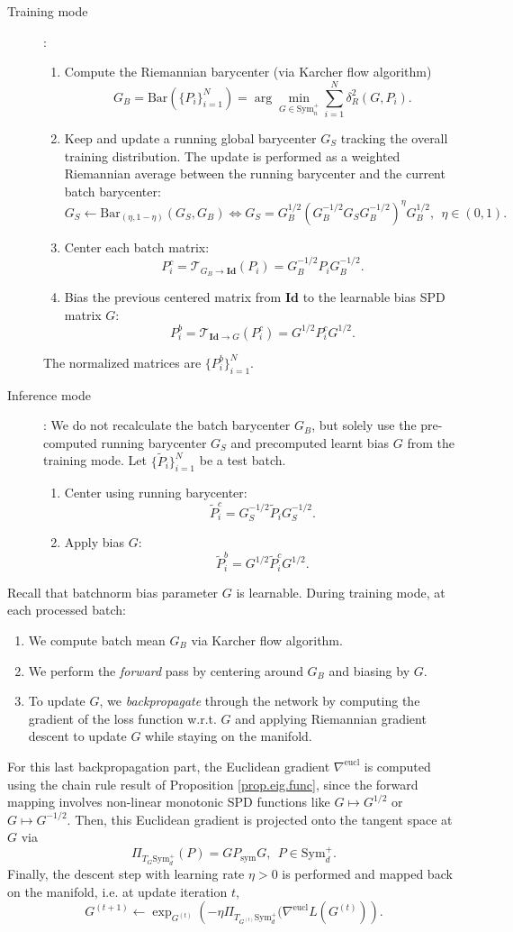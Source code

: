 \documentclass[10pt,a4paper]{book}
\theoremstyle{definition}
\theoremstyle{plain}
\theoremstyle{remark}
\newcommand{\Id}{\mathrm{\textbf{Id}}}
\begin{document}
\begin{description}
\item[Training mode]: 
\begin{enumerate}
\item Compute the Riemannian barycenter (via Karcher flow algorithm)
$$G_B=\text{Bar}(\{P_i\}_{i=1}^{N})=\arg\min_{G\in \text{Sym}_n^{+}}\sum_{i=1}^{N}\delta_R^{2}(G,P_i).$$
\item Keep and update a running global barycenter $G_S$ tracking the overall training distribution. The update is performed as a weighted Riemannian average between the running barycenter and the current batch barycenter:
$$G_S\leftarrow \text{Bar}_{(\eta,1-\eta)}(G_S,G_B) \iff G_S=G_B^{1/2}(G_B^{-1/2}G_SG_B^{-1/2})^{\eta}G_B^{1/2},~~\eta \in (0,1).$$
\item Center each batch matrix:
$$P_i^{c}=\mathcal{T}_{G_B\to \Id}(P_i)=G_B^{-1/2}P_iG_B^{-1/2}.$$
\item Bias the previous centered matrix from $\Id$ to the learnable bias SPD matrix $G$:
$$P_{i}^{b}=\mathcal{T}_{\Id \to G}(P_i^{c})=G^{1/2}P_i^{c}G^{1/2}.$$
\end{enumerate}
The normalized matrices are $\{P_i^{b}\}_{i=1}^{N}$. 
\item[Inference mode]:
We do not recalculate the batch barycenter $G_B$, but solely use the pre-computed running barycenter $G_S$  and precomputed learnt bias $G$ from the training mode. Let $\{\tilde{P}_i\}_{i=1}^{N}$ be a test batch. 
\begin{enumerate}
\item Center using running barycenter:
$$\tilde{P}_i^{c}=G_S^{-1/2}\tilde{P}_iG_S^{-1/2}.$$
\item Apply bias $G$:
$$\tilde{P}_i^{b}=G^{1/2}\tilde{P}_i^{c}G^{1/2}.$$
\end{enumerate}
\end{description}
Recall that batchnorm bias parameter $G$ is learnable.
During training mode, at each processed batch:
\begin{enumerate}
\item We compute batch mean $G_B$ via Karcher flow algorithm.
\item We perform the \emph{forward} pass by centering around $G_B$ and biasing by $G$.
\item To update $G$, we \emph{backpropagate} through the network by computing the gradient of the loss function w.r.t. $G$ and applying Riemannian gradient descent to update $G$ while staying on the manifold. 
\end{enumerate}
For this last backpropagation part, the Euclidean gradient $\nabla^{\text{eucl}}$ is computed using the chain rule result of Proposition  \ref{prop.eig.func}, since the forward mapping involves non-linear monotonic SPD functions like $G\mapsto G^{1/2}$ or $G\mapsto G^{-1/2}$. Then, this Euclidean gradient is projected onto the tangent space at $G$ via
$$\Pi_{T_G\text{Sym}_d^{+}}(P)=GP_{\text{sym}}G,~~P\in \text{Sym}_d^{+}.$$
Finally, the descent step with learning rate $\eta>0$ is performed and mapped back on the manifold, i.e. at update iteration $t$, 
$$G^{(t+1)}\leftarrow \exp_{G^{(t)}}\left(-\eta \Pi_{T_{G^{(t)}}\text{Sym}_d^{+}}(\nabla^{\text{eucl}}L(G^{(t)})\right).$$
\end{document}
